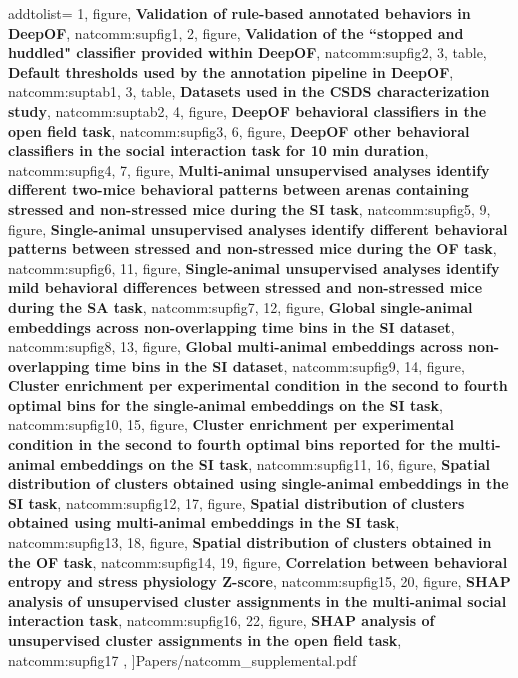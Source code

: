            addtolist={
           1, figure, \textbf{Validation of rule-based annotated behaviors in DeepOF}, natcomm:supfig1,
           2, figure, \textbf{Validation of the ``stopped and huddled" classifier provided within DeepOF}, natcomm:supfig2,
           3, table, \textbf{Default thresholds used by the annotation pipeline in DeepOF}, natcomm:suptab1,
           3, table, \textbf{Datasets used in the CSDS characterization study}, natcomm:suptab2,
           4, figure, \textbf{DeepOF behavioral classifiers in the open field task}, natcomm:supfig3,
           6, figure, \textbf{DeepOF other behavioral classifiers in the social interaction task for 10 min duration}, natcomm:supfig4,
           7, figure, \textbf{Multi-animal unsupervised analyses identify different two-mice behavioral patterns between arenas containing stressed and non-stressed mice during the SI task}, natcomm:supfig5,
           9, figure, \textbf{Single-animal unsupervised analyses identify different behavioral patterns between stressed and non-stressed mice during the OF task}, natcomm:supfig6,
           11, figure, \textbf{Single-animal unsupervised analyses identify mild behavioral differences between stressed and non-stressed mice during the SA task}, natcomm:supfig7,
           12, figure, \textbf{Global single-animal embeddings across non-overlapping time bins in the SI dataset}, natcomm:supfig8,
           13, figure, \textbf{Global multi-animal embeddings across non-overlapping time bins in the SI dataset}, natcomm:supfig9,
           14, figure, \textbf{Cluster enrichment per experimental condition in the second to fourth optimal bins for the single-animal embeddings on the SI task}, natcomm:supfig10,
           15, figure, \textbf{Cluster enrichment per experimental condition in the second to fourth optimal bins reported for the multi-animal embeddings on the SI task}, natcomm:supfig11,
           16, figure, \textbf{Spatial distribution of clusters obtained using single-animal embeddings in the SI task}, natcomm:supfig12,
           17, figure, \textbf{Spatial distribution of clusters obtained using multi-animal embeddings in the SI task}, natcomm:supfig13,
           18, figure, \textbf{Spatial distribution of clusters obtained in the OF task}, natcomm:supfig14,
           19, figure, \textbf{Correlation between behavioral entropy and stress physiology Z-score}, natcomm:supfig15,
           20, figure, \textbf{SHAP analysis of unsupervised cluster assignments in the multi-animal social interaction task}, natcomm:supfig16,
           22, figure, \textbf{SHAP analysis of unsupervised cluster assignments in the open field task}, natcomm:supfig17
           },
           ]{Papers/natcomm_supplemental.pdf}